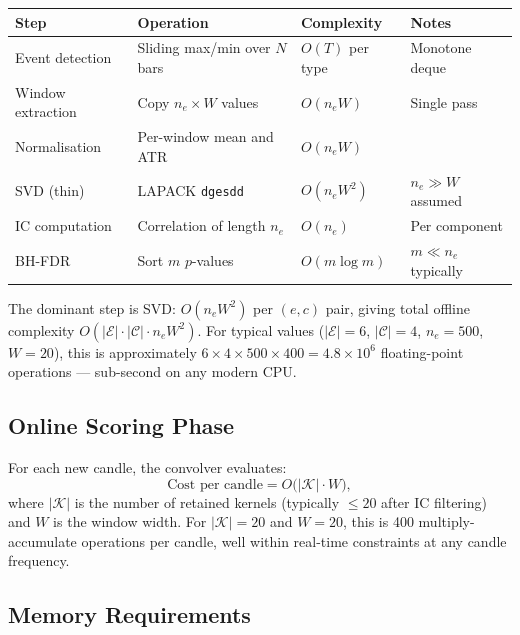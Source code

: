 \documentclass[11pt,a4paper]{article}
\theoremstyle{definition}
\theoremstyle{plain}
\begin{document}
\begin{center}
\begin{tabular}{llll}
\hline
\textbf{Step} & \textbf{Operation} & \textbf{Complexity} & \textbf{Notes} \\
\hline
Event detection & Sliding max/min over $N$ bars & $O(T)$ per type
                & Monotone deque \\
Window extraction & Copy $n_e \times W$ values & $O(n_e W)$
                & Single pass \\
Normalisation & Per-window mean and ATR & $O(n_e W)$ & \\
SVD (thin) & LAPACK \texttt{dgesdd} & $O(n_e W^2)$
                & $n_e \gg W$ assumed \\
IC computation & Correlation of length $n_e$ & $O(n_e)$
                & Per component \\
BH-FDR & Sort $m$ $p$-values & $O(m \log m)$
                & $m \ll n_e$ typically \\
\hline
\end{tabular}
\end{center}

The dominant step is SVD: $O(n_e W^2)$ per $(e,c)$ pair, giving total offline complexity
$O(|\mathcal{E}| \cdot |\mathcal{C}| \cdot n_e W^2)$. For typical values
($|\mathcal{E}|=6$, $|\mathcal{C}|=4$, $n_e = 500$, $W = 20$), this is approximately
$6 \times 4 \times 500 \times 400 = 4.8 \times 10^6$ floating-point operations ---
sub-second on any modern CPU.

\subsection{Online Scoring Phase}

For each new candle, the convolver evaluates:
\begin{equation}
    \text{Cost per candle} = O\!\bigl(|\mathcal{K}| \cdot W\bigr),
    \label{eq:online_complexity}
\end{equation}
where $|\mathcal{K}|$ is the number of retained kernels (typically $\leq 20$ after IC
filtering) and $W$ is the window width. For $|\mathcal{K}| = 20$ and $W = 20$, this is
400 multiply-accumulate operations per candle, well within real-time constraints at any
candle frequency.

\subsection{Memory Requirements}
\end{document}
